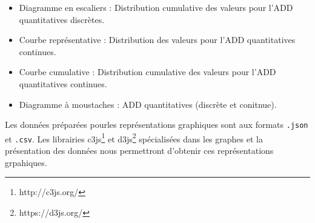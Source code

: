 \begin{enumerate}
\begin{itemize}
						\item Diagramme en escaliers : Distribution cumulative des valeurs pour l'ADD quantitatives discrètes.
						\item Courbe représentative : Distribution des valeurs pour l'ADD quantitatives continues.
						\item Courbe cumulative : Distribution cumulative des valeurs pour l'ADD quantitatives continues.
						\item Diagramme à moustaches : ADD quantitatives (discrète et conitnue).
					\end{itemize}
					Les données préparées pourles représentations graphiques sont aux formats \lstinline!.json! et \lstinline!.csv!. Les librairies c3js\footnote{http://c3js.org/} et d3js\footnote{https://d3js.org/} spécialisées dans les graphes et la présentation des données nous permettront d'obtenir ces représentations grpahiques.
			\end{enumerate}
	

